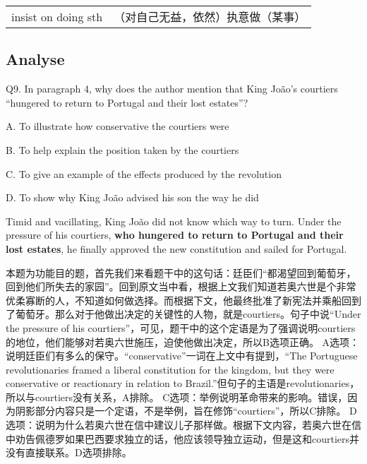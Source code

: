 \begin{tabular}{ll}
    insist on doing sth & （对自己无益，依然）执意做（某事） \\
\end{tabular}

\subsection{Analyse}

\begin{blk}
    \begin{qst}
        Q9. In paragraph 4, why does the author mention that King João’s courtiers “hungered to return to Portugal and their lost estates”?
    \end{qst}

    \begin{chc}
        A. To illustrate how conservative the courtiers were

        B. To help explain the position taken by the courtiers

        C. To give an example of the effects produced by the revolution

        D. To show why King João advised his son the way he did
    \end{chc}

    \begin{psgq}
        Timid and vacillating, King João did not know which way to turn. Under the pressure of his courtiers, \textbf{who hungered to return to Portugal and their lost estates}, he finally approved the new constitution and sailed for Portugal.
    \end{psgq}

    \begin{nlz}
        本题为功能目的题，首先我们来看题干中的这句话：廷臣们“都渴望回到葡萄牙，回到他们所失去的家园”。回到原文当中看，根据上文我们知道若奥六世是个非常优柔寡断的人，不知道如何做选择。而根据下文，他最终批准了新宪法并乘船回到了葡萄牙。那么对于他做出决定的关键性的人物，就是courtiers。句子中说“Under the pressure of his courtiers”，可见，题干中的这个定语是为了强调说明courtiers的地位，他们能够对若奥六世施压，迫使他做出决定，所以B选项正确。 A选项：说明廷臣们有多么的保守。“conservative”一词在上文中有提到，“The Portuguese revolutionaries framed a liberal constitution for the kingdom, but they were conservative or reactionary in relation to Brazil.”但句子的主语是revolutionaries，所以与courtiers没有关系，A排除。 C选项：举例说明革命带来的影响。错误，因为阴影部分内容只是一个定语，不是举例，旨在修饰“courtiers”，所以C排除。 D选项：说明为什么若奥六世在信中建议儿子那样做。根据下文内容，若奥六世在信中劝告佩德罗如果巴西要求独立的话，他应该领导独立运动，但是这和courtiers并没有直接联系。D选项排除。
    \end{nlz}
\end{blk}

